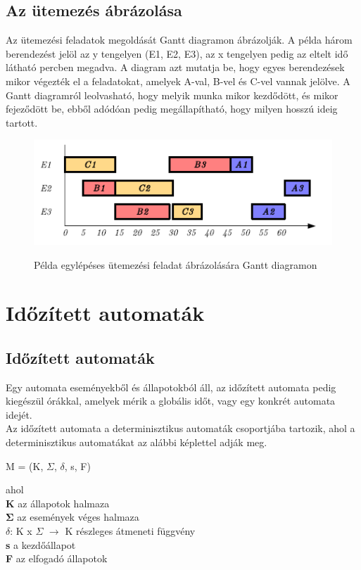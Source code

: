\documentclass [12pt]{report}
\begin{document}
\section{Az ütemezés ábrázolása}
Az ütemezési feladatok megoldását Gantt diagramon ábrázolják. A példa három berendezést jelöl az y tengelyen (E1, E2, E3), az x tengelyen pedig az eltelt idő látható percben megadva. A diagram azt mutatja be, hogy egyes berendezések mikor végezték el a feladatokat, amelyek A-val, B-vel és C-vel vannak jelölve. A Gantt diagramról leolvasható, hogy melyik munka mikor kezdődött, és mikor fejeződött be, ebből adódóan pedig megállapítható, hogy milyen hosszú ideig tartott. \cite{Ghaeli2005}
\begin{figure}[h]
\begin{center}
\includegraphics{gantt}\\
\caption{Példa egylépéses ütemezési feladat ábrázolására Gantt diagramon}
\end{center}
\end{figure}

 

\chapter{Időzített automaták}

\section{Időzített automaták}
 Egy automata eseményekből és állapotokból áll, az időzített automata pedig kiegészül órákkal, amelyek mérik a globális időt, vagy egy konkrét automata idejét. \\
 Az időzített automata a determinisztikus automaták csoportjába tartozik, ahol a determinisztikus automatákat az alábbi képlettel adják meg.\cite{Subbiah2009}
 \begin{center}
 M = (K, $\Sigma$, $\delta$, s, F)
 \end{center}
 ahol\\
 \indent \textbf{K} az állapotok halmaza\\
 \indent $\mathbf{\Sigma}$ az események véges halmaza\\
 \indent \textbf{$\delta$}: K x $\Sigma$ $\rightarrow$ K részleges átmeneti függvény\\
 \indent \textbf{s} a kezdőállapot\\
 \indent \textbf{F} az elfogadó állapotok \\\\
 
\end{document}
